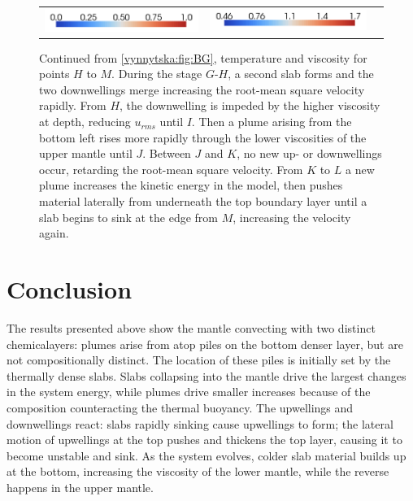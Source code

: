 \begin{figure}[htbp]
\begin{center}
\begin{tabular}{c c l}
\includegraphics[width=0.45\columnwidth]{chapters/vynnytska/figures/tmleg.png} &
\includegraphics[width=0.45\columnwidth]{chapters/vynnytska/figures/visleg.png} &
\end{tabular}
\end{center}
\label{vynnytska:fig:HM}
\caption{Continued from \ref{vynnytska:fig:BG}, temperature and
  viscosity for points $H$ to $M$. During the stage $G$-$H$, a second
  slab forms and the two downwellings merge increasing the root-mean
  square velocity rapidly. From $H$, the downwelling is impeded by the
  higher viscosity at depth, reducing $u_{rms}$ until $I$. Then a
  plume arising from the bottom left rises more rapidly through the
  lower viscosities of the upper mantle until $J$. Between $J$ and
  $K$, no new up- or downwellings occur, retarding the root-mean
  square velocity. From $K$ to $L$ a new plume increases the kinetic
  energy in the model, then pushes material laterally from underneath
  the top boundary layer until a slab begins to sink at the edge from
  $M$, increasing the velocity again.}
\end{figure}


\section{Conclusion}

The results presented above show the mantle convecting with two
distinct chemicalayers: plumes arise from atop piles on the bottom
denser layer, but are not compositionally distinct. The location of
these piles is initially set by the thermally dense slabs. Slabs
collapsing into the mantle drive the largest changes in the system
energy, while plumes drive smaller increases because of the
composition counteracting the thermal buoyancy. The upwellings and
downwellings react: slabs rapidly sinking cause upwellings to form;
the lateral motion of upwellings at the top pushes and thickens the
top layer, causing it to become unstable and sink. As the system
evolves, colder slab material builds up at the bottom, increasing the
viscosity of the lower mantle, while the reverse happens in the upper
mantle.

